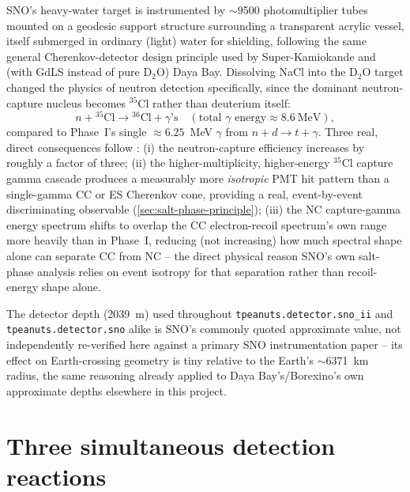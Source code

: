 \begin{theorybox}
SNO's heavy-water target is instrumented by $\sim$9500 photomultiplier tubes
mounted on a geodesic support structure surrounding a transparent acrylic
vessel, itself submerged in ordinary (light) water for shielding, following
the same general Cherenkov-detector design principle used by Super-Kamiokande
and (with GdLS instead of pure D$_2$O) Daya Bay. Dissolving NaCl into the
D$_2$O target changed the physics of neutron detection specifically, since
the dominant neutron-capture nucleus becomes $^{35}$Cl rather than deuterium
itself:
\begin{equation}
  n + {}^{35}\mathrm{Cl} \rightarrow {}^{36}\mathrm{Cl} + \gamma\text{'s}
  \quad(\text{total }\gamma\text{ energy}\approx 8.6~\mathrm{MeV}),
\end{equation}
compared to Phase~I's single $\approx6.25$~MeV $\gamma$ from
$n+d\rightarrow t+\gamma$. Three real, direct consequences follow
\parencite{Aharmim2005SaltPhase}: (i) the neutron-capture efficiency
increases by roughly a factor of three; (ii) the higher-multiplicity,
higher-energy $^{35}$Cl capture gamma cascade produces a measurably more
\emph{isotropic} PMT hit pattern than a single-gamma CC or ES Cherenkov cone,
providing a real, event-by-event discriminating observable
(\cref{sec:salt-phase-principle}); (iii) the NC capture-gamma energy spectrum
shifts to overlap the CC electron-recoil spectrum's own range more heavily
than in Phase~I, reducing (not increasing) how much spectral shape alone can
separate CC from NC -- the direct physical reason SNO's own salt-phase
analysis relies on event isotropy for that separation rather than
recoil-energy shape alone.
\end{theorybox}

\begin{notebox}
The detector depth (2039~m) used throughout \texttt{tpeanuts.detector.sno\_ii}
and \texttt{tpeanuts.detector.sno} alike is SNO's commonly quoted approximate
value, not independently re-verified here against a primary SNO
instrumentation paper -- its effect on Earth-crossing geometry is tiny
relative to the Earth's $\sim$6371~km radius, the same reasoning already
applied to Daya Bay's/Borexino's own approximate depths elsewhere in this
project.
\end{notebox}

\section{Three simultaneous detection reactions}
\label{sec:three-reactions}

